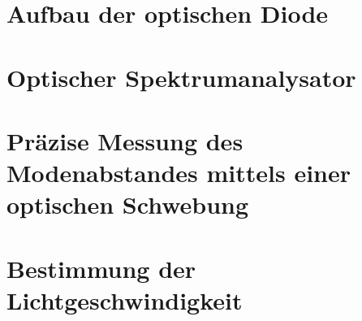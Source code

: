 \chapter{ Aufbau der optischen Diode}

\chapter{Optischer Spektrumanalysator}

\chapter{ Präzise Messung des Modenabstandes mittels einer
optischen Schwebung}

\chapter{Bestimmung der Lichtgeschwindigkeit}

